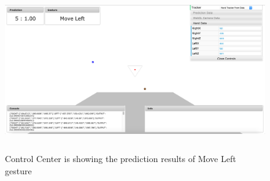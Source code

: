 \begin{figure}
	[h] \centering 
	\includegraphics[height=70mm]{figures/result/cc-move-left.jpg} \caption{Control Center is showing the prediction results of Move Left gesture}
	\label{res:cc:move:left}	 
\end{figure}
